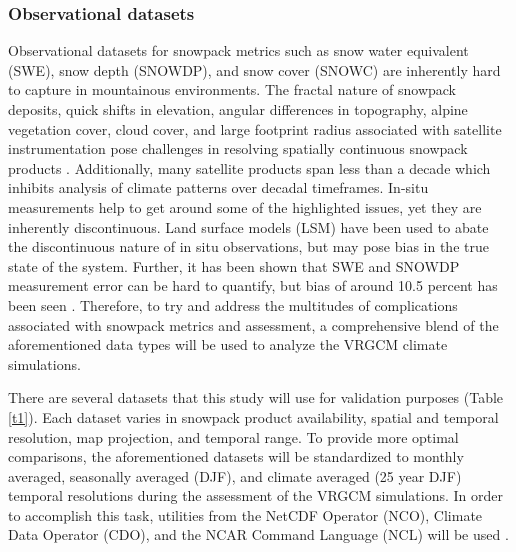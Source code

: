 \documentclass[11pt]{article}
\begin{document}
\subsubsection{Observational datasets}

Observational datasets for snowpack metrics such as snow water equivalent (SWE), snow depth (SNOWDP), and snow cover (SNOWC) are inherently hard to capture in mountainous environments.  The fractal nature of snowpack deposits, quick shifts in elevation, angular differences in topography, alpine vegetation cover, cloud cover, and large footprint radius associated with satellite instrumentation pose challenges in resolving spatially continuous snowpack products \citep{brownandmote2009, rutter2009SnowMIP2}.  Additionally, many satellite products span less than a decade which inhibits analysis of climate patterns over decadal timeframes.  In-situ measurements help to get around some of the highlighted issues, yet they are inherently discontinuous.  Land surface models (LSM) have been used to abate the discontinuous nature of in situ observations, but may pose bias in the true state of the system.  Further, it has been shown that SWE and SNOWDP measurement error can be hard to quantify, but bias of around 10.5 percent has been seen \citep{ rutter2009SnowMIP2}.  Therefore, to try and address the multitudes of complications associated with snowpack metrics and assessment, a comprehensive blend of the aforementioned data types will be used to analyze the VRGCM climate simulations. 

There are several datasets that this study will use for validation purposes (Table \ref{t1}).  Each dataset varies in snowpack product availability, spatial and temporal resolution, map projection, and temporal range.  To provide more optimal comparisons, the aforementioned datasets will be standardized to monthly averaged, seasonally averaged (DJF), and climate averaged (25 year DJF) temporal resolutions during the assessment of the VRGCM simulations.  In order to accomplish this task, utilities from the NetCDF Operator (NCO), Climate Data Operator (CDO), and the NCAR Command Language (NCL) will be used \citep{schulzweida2007cdo,zender2006netcdf}.  
\end{document}
